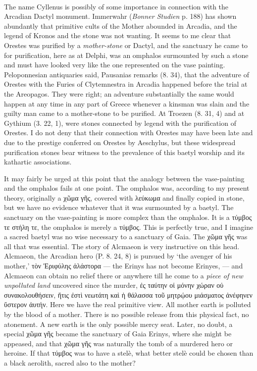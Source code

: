 \documentclass[a4paper, 11pt, oneside, polutonikogreek, english]{article}
\begin{document}
\paragraph{}
The name Cyllenus is possibly of some importance in connection with the Arcadian Dactyl monument. Immerwahr (\emph{Bonner Studien} p. 188) has shown abundantly that primitive cults of the Mother abounded in Arcadia, and the legend of Kronos and the stone was not wanting. It seems to me clear that Orestes was purified by a \emph{mother-stone} or Dactyl, and the sanctuary he came to for purification, here as at Delphi, was an omphalos surmounted by such a stone and must have looked very like the one represented on the vase painting. Peloponnesian antiquaries said, Pausanias remarks (8. 34), that the adventure of Orestes with the Furies of Clytemnestra in Arcadia happened before the trial at the Areopagos. They were right; an adventure substantially the same would happen at any time in any part of Greece whenever a kinsman was slain and the guilty man came to a mother-stone to be purified. At Troezen (8. 31, 4) and at Gythium (3. 22, 1), were stones connected by legend with the purification of Orestes. I do not deny that their connection with Orestes may have been late and due to the prestige conferred on Orestes by Aeschylus, but these widespread purification stones bear witness to the prevalence of this baetyl worship and its kathartic associations.

It may fairly be urged at this point that the analogy between the vase-painting and the omphalos fails at one point. The omphalos was, according to my present theory, originally a χῶμα γῆς, covered with λεύκωμα and finally copied in stone, but we have no evidence whatever that it was surmounted by a baetyl. The sanctuary on the vase-painting is more complex than the omphalos. It is a τύμβος τε στήλη τε, the omphalos is merely a τύμβος. This is perfectly true, and I imagine a sacred baetyl was no wise necessary to a sanctuary of Gaia. The χῶμα γῆς was all that was essential. The story of Alcmaeon is very instructive on this head. Alcmaeon, the Arcadian hero (P. 8. 24, 8) is pursued by `the avenger of his mother,' τὸν Ἐριφύλης ἀλάστορα --- the Erinys has not become Erinyes, --- and Alcmaeon can obtain no relief there or anywhere till he come to a \emph{piece of new unpolluted land} uncovered since the murder, ἐς ταύτην οἱ μόνην χώραν οὐ συνακολουθήσειν, ἥτις ἐστὶ νεωτάτη καὶ ἡ θάλασσα τοῦ μητρῴου μιάσματος ἀνέφηνεν ὕστερον ἀυτήν. Here we have the real primitive view. All mother earth is polluted by the blood of a mother. There is no possible release from this physical fact, no atonement. A new earth is the only possible mercy seat. Later, no doubt, a special χῶμα γῆς became the sanctuary of Gaia Erinys, where she might be appeased, and that χῶμα γῆς was naturally the tomb of a murdered hero or heroine. If that τύμβος was to have a stelè, what better stelè could be chosen than a black aerolith, sacred also to the mother?
\end{document}
